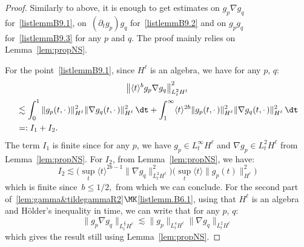 \begin{proof}
Similarly to above, it is enough to get estimates on $g_p \nabla g_q$ for~\eqref{listlemmB9.1}, on~$(\partial_t g_p) g_q$ for~\eqref{listlemmB9.2} and on $g_pg_q$ for~\eqref{listlemmB9.3} for any $p$ and $q$. The proof mainly relies on Lemma~\ref{lem:propNS}.


For the point~\eqref{listlemmB9.1}, since $H^\ell $ is an algebra, we have for any $p$, $q$:
\begin{multline*}
\left\|\langle t \rangle^b g_p \nabla g_q\right\|^2_{L^2_tH^\ell } \\
\begin{aligned}
&\lesssim \int_0^1 \|g_p(t,\cdot\,) \|^2_{H^\ell } \|\nabla g_q(t,\cdot\,)\|^2_{H^\ell } \, \dt + \int_1^\infty \langle t \rangle^{2b} \|g_p(t,\cdot\,)\|^2_{H^\ell } \|\nabla g_q(t,\cdot\,)\|^2_{H^\ell } \, \dt \\
&=: I_1+I_2.
\end{aligned}
\end{multline*}
The term $I_1$ is finite since for any $p$, we have $g_p \in L^\infty_t H^\ell$ and $\nabla g_p \in L^2_t H^\ell$ from Lemma~\ref{lem:propNS}. For $I_2$, from Lemma~\ref{lem:propNS}, we have:
\[
I_2 \lesssim\Big(\sup_t {\langle t \rangle^{2b -1}} \|\nabla g_q\|_{L^2_t H^\ell}^2\Big) \Big(\sup_t \langle t \rangle \| g_p(t)\|_{ H^\ell}^2\Big)
\]
which is finite since~$b \leq 1/2,$ from which we can conclude. For the second part of~\ref{lem:gamma&tildegammaR2}$\MK$\eqref{listlemm.B6.1}, using that $H^\ell$ is an algebra and H\"older's inequality in time, we can write that for any $p$, $q$:
\[
\|g_p \nabla g_q\|_{L^{\frac43}_t H^\ell} \lesssim \|g_p\|_{L^4_t H^\ell} \|\nabla g_q\|_{L^2_t H^\ell}
\]
which gives the result still using Lemma~\ref{lem:propNS}.




\end{proof}
